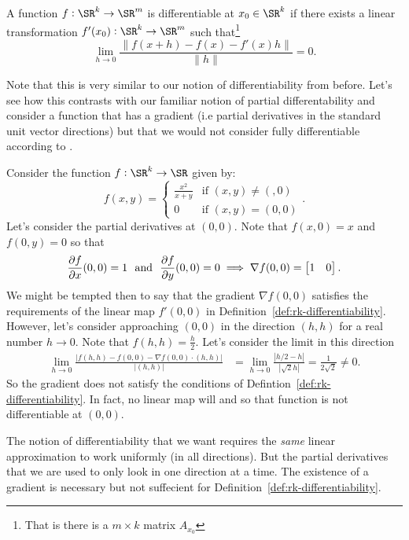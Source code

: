 \begin{definition}[Differentiabiltiy in \(\SR^k\)]
	\label{def:rk-differentiability}
	A function \(f:\SR^k\to\SR^m\) is differentiable at \(x_0\in\SR^k\) if there exists a linear transformation \(f'(x_0):\SR^k\to\SR^m\) such that\footnote{That is there is a \(m\times k\) matrix  \(A_{x_0}\)} 
	\begin{equation}
		\label{eq:rk-differntiability}
		\lim_{h\to 0}\frac{\|f(x+h)-f(x)-f'(x)h\|}{\|h\|}=0 
	.\end{equation} 
\end{definition}
Note that this is very similar to our notion of differentiability from before. Let's see how this contrasts with our familiar notion of partial differentability and consider a function that has a gradient (i.e partial derivatives in the standard unit vector directions) but that we would not consider fully differentiable according to .
\begin{example*}
	Consider the function \(f:\SR^k \to \SR\) given by:
	\[
		f(x,y) = 
		\begin{cases}
			\frac{x^2}{x+y}  & \text{if }(x,y)\neq (,0) \\
			0 &\text{if }(x,y) = (0,0)
		\end{cases}	
	.\]
	Let's consider the partial derivatives at \((0,0)\). Note that \(f(x,0) = x\) and  \(f(0,y) = 0\) so that
	\[
		\frac{\partial f}{\partial x}(0,0) = 1 \hbox{ }\text{ and }\hbox{ } \frac{\partial f}{\partial y}(0,0) = 0 \implies \nabla f(0,0) = \begin{bmatrix} 1 & 0 \end{bmatrix} 
	.\] 
	We might be tempted then to say that the gradient \(\nabla f(0,0)\) satisfies the requirements of the linear map  \(f'(0,0)\) in Definition~\ref{def:rk-differentiability}. However, let's consider approaching \((0,0)\) in the direction  \((h,h)\) for a real number \(h\to 0\). Note that \(f(h,h) = \frac{h}{2}\). Let's consider the limit in this direction
	\begin{align*}
		\lim_{h\to 0}\frac{|f(h,h) - f(0,0) - \nabla f(0,0)\cdot(h,h)|}{|(h,h)|} &= \lim_{h\to 0}\frac{|h/2 - h|}{|\sqrt{2}h|} = \frac{1}{2\sqrt{2}}\neq 0  
	.\end{align*} 
	So the gradient does not satisfy the conditions of Defintion~\ref{def:rk-differentiability}. In fact, no linear map will and so that function is not differentiable at \((0,0)\).
\end{example*}
\begin{remark*}
	The notion of differentiability that we want requires the \textit{same} linear approximation to work uniformly (in all directions). But the partial derivatives that we are used to only look in one direction at a time. The existence of a gradient is necessary but not suffecient for Definition~\ref{def:rk-differentiability}.	
\end{remark*}

